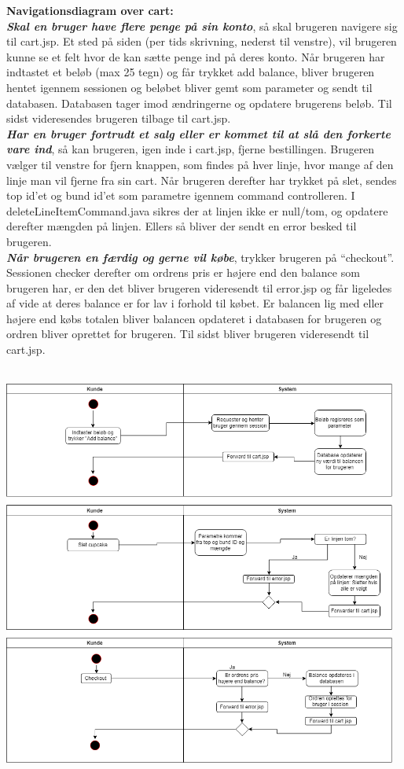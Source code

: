 \documentclass[11pt]{report}
\begin{document}
\noindent
\textbf{Navigationsdiagram over cart:}\\
\textbf{\textit{Skal en bruger have flere penge på sin konto}}, så skal
brugeren navigere sig til cart.jsp. Et sted på siden (per tids
skrivning, nederst til venstre), vil brugeren kunne se et felt hvor de
kan sætte penge ind på deres konto. Når brugeren har indtastet et
beløb (max 25 tegn) og får trykket add balance, bliver brugeren hentet
igennem sessionen og beløbet bliver gemt som parameter og sendt til
databasen. Databasen tager imod ændringerne og opdatere brugerens
beløb. Til sidst videresendes brugeren tilbage til cart.jsp.\\
\textbf{\textit{Har en bruger fortrudt et salg eller er kommet til at slå den
  forkerte vare ind}}, så kan brugeren, igen inde i cart.jsp, fjerne
bestillingen. Brugeren vælger til venstre for fjern knappen, som
findes på hver linje, hvor mange af den linje man vil fjerne fra sin
cart. Når brugeren derefter har trykket på slet, sendes top id'et og
bund id'et som parametre igennem command controlleren. I
deleteLineItemCommand.java sikres der at linjen ikke er null/tom, og
opdatere derefter mængden på linjen. Ellers så bliver der sendt en
error besked til brugeren.\\
\textbf{\textit{Når brugeren en færdig og gerne vil købe}}, trykker brugeren på
“checkout”. Sessionen checker derefter om ordrens pris er højere end
den balance som brugeren har, er den det bliver brugeren videresendt
til error.jsp og får ligeledes af vide at deres balance er for lav i
forhold til købet. Er balancen lig med eller højere end købs totalen
bliver balancen opdateret i databasen for brugeren og ordren bliver
oprettet for brugeren. Til sidst bliver brugeren videresendt til
cart.jsp.\\\\
\begin{center}
\includegraphics[width=13cm]{CartCupcake.png}
\end{center}
\newpage
\end{document}
